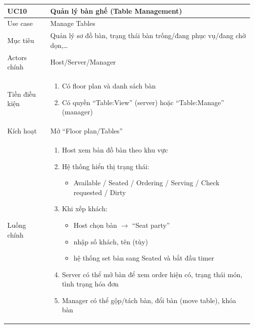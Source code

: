 \begin{longtable}{|>{\raggedright\arraybackslash}p{}|>{\raggedright\arraybackslash}p{}|}
\hline
\textbf{UC10} & \textbf{Quản lý bàn ghế (Table Management)} \\
\hline
Use case & Manage Tables \\
\hline
Mục tiêu & Quản lý sơ đồ bàn, trạng thái bàn trống/đang phục vụ/đang chờ dọn,… \\
\hline
Actors chính & Host/Server/Manager \\
\hline
Tiền điều kiện &
\vspace{-0.5em}
\begin{enumerate}[leftmargin=*]
\item Có floor plan và danh sách bàn
\item Có quyền “Table:View” (server) hoặc “Table:Manage” (manager)
\end{enumerate}
\vspace{-0.5em}
\\
\hline
Kích hoạt & Mở “Floor plan/Tables” \\
\hline
Luồng chính &
\vspace{-0.5em}
\begin{enumerate}[leftmargin=*]
\item Host xem bản đồ bàn theo khu vực
\item Hệ thống hiển thị trạng thái:
\vspace{-0.5em}
\begin{itemize}[leftmargin=*]
\item Available / Seated / Ordering / Serving / Check requested / Dirty
\end{itemize}
\vspace{-0.5em}
\item Khi xếp khách:
\vspace{-0.5em}
\begin{itemize}[leftmargin=*]
\item Host chọn bàn $\rightarrow$ “Seat party”
\item nhập số khách, tên (tùy)
\item hệ thống set bàn sang Seated và bắt đầu timer
\end{itemize}
\vspace{-0.5em}
\item Server có thể mở bàn để xem order hiện có, trạng thái món, tình trạng hóa đơn
\item Manager có thể gộp/tách bàn, đổi bàn (move table), khóa bàn

\end{enumerate}
\end{longtable}
